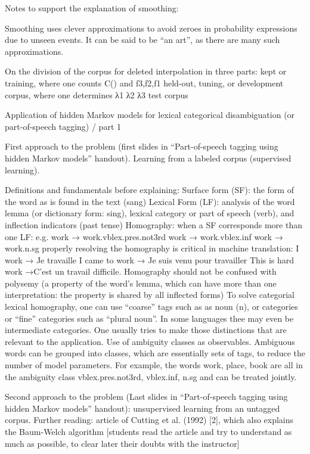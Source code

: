 Notes to support the explanation of smoothing: 
	 	 	
Smoothing uses clever approximations to avoid zeroes in probability expressions due to unseen events. It can be said to be “an art”, as there are many such approximations.

On the division of the corpus for deleted interpolation in three parts:
kept or training, where one counts 	C() and  f3,f2,f1
held-out, tuning, or development corpus, where one determines λ1 λ2 λ3
test corpus


Application of hidden Markov models for lexical categorical disambiguation (or part-of-speech tagging) / part 1

First approach to the problem (first slides in “Part-of-speech tagging using hidden Markov models” handout). Learning from a labeled corpus (supervised learning).

Definitions and fundamentals before explaining:
Surface form (SF): the form of the word as is found in the text (sang)
Lexical Form (LF): analysis of the word 
lemma (or dictionary form: sing), 
lexical category or part of speech (verb), and 
inflection indicators (past tense)
Homography: when a SF corresponds more than one LF: e.g.
work → work.vblex.pres.not3rd
work → work.vblex.inf
work → work.n.sg 
properly resolving the homography is critical in machine translation:
I work → Je travaille
I came to work → Je suis venu pour travailler
This is hard work →C’est un travail difficile.
Homography should not be confused with polysemy (a property of the word’s lemma, which can have more than one interpretation: the property is shared by all inflected forms)
To solve categorial lexical homography, one can use “coarse” tags such as as noun (n), or categories or “fine” categories such as “plural noun”. In some languages thee may even be intermediate categories. One usually tries to make those distinctions that are relevant to the application.
Use of ambiguity classes as observables. Ambiguous words can be grouped into  classes, which are essentially sets of tags, to reduce the number of model parameters. For example, the words work, place, book are all in the ambiguity class {vblex.pres.not3rd, vblex.inf, n.sg} and can be treated jointly.

Second approach to the problem (Last slides in “Part-of-speech tagging using hidden Markov models” handout): unsupervised learning from an untagged corpus. Further reading: article of Cutting et al. (1992) [2], which also explains the Baum-Welch algorithm [students read the article and try to understand as much as possible, to clear later their doubts with the instructor]





